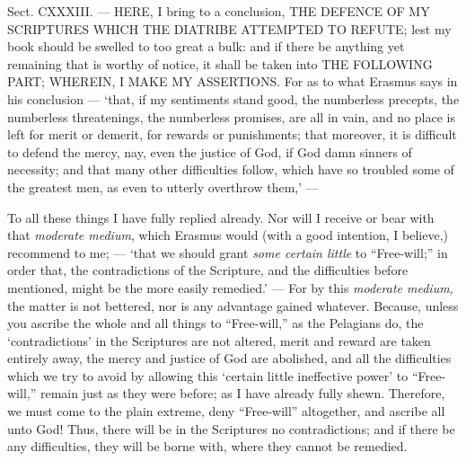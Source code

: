 
Sect. CXXXIII. — HERE, I bring to a conclusion, \textsc{THE DEFENCE OF MY SCRIPTURES WHICH THE DIATRIBE ATTEMPTED TO REFUTE}; lest my book should be swelled to too great a bulk: and if there be anything yet remaining that is worthy of notice, it shall be taken into \textsc{THE FOLLOWING PART; WHEREIN, I MAKE MY ASSERTIONS}. For as to what Erasmus says in his conclusion — ‘that, if my sentiments stand good, the numberless precepts, the numberless threatenings, the numberless promises, are all in vain, and no place is left for merit or demerit, for rewards or punishments; that moreover, it is difficult to defend the mercy, nay, even the justice of God, if God damn sinners of necessity; and that many other difficulties follow, which have so troubled some of the greatest men, as even to utterly overthrow them,’ —

To all these things I have fully replied already. Nor will I receive or bear with that \emph{moderate medium}, which Erasmus would (with a good intention, I believe,) recommend to me; — ‘that we should grant \emph{some certain little }to “Free-will;” in order that, the contradictions of the Scripture, and the difficulties before mentioned, might be the more easily remedied.’ — For by this \emph{moderate medium, }the matter is not bettered, nor is any advantage gained whatever. Because, unless you ascribe the whole and all things to “Free-will,” as the Pelagians do, the ‘contradictions’ in the Scriptures are not altered, merit and reward are taken entirely away, the mercy and justice of God are abolished, and all the difficulties which we try to avoid by allowing this ‘certain little ineffective power’ to “Free-will,” remain just as they were before; as I have already fully shewn. Therefore, we must come to the plain extreme, deny “Free-will” altogether, and ascribe all unto God! Thus, there will be in the Scriptures no contradictions; and if there be any difficulties, they will be borne with, where they cannot be remedied.


